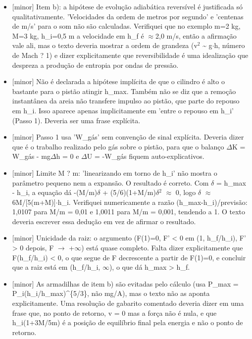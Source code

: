 \documentclass{article}%
\begin{document}
\begin{itemize}%
\item%
{[}minor{]} Item b): a hipótese de evolução adiabática reversível é justificada só qualitativamente. 'Velocidades da ordem de metros por segundo' e 'centenas de m/s' para o som não são calculadas. Verifiquei que no exemplo m=2 kg, M=3 kg, h\_i=0,5 m a velocidade em h\_f é $\approx$2,0 m/s, então a afirmação vale ali, mas o texto deveria mostrar a ordem de grandeza (v$^2$ \textasciitilde{} g$\cdot$h, número de Mach ? 1) e dizer explicitamente que reversibilidade é uma idealização que despreza a produção de entropia por ondas de pressão.%
\item%
{[}minor{]} Não é declarada a hipótese implícita de que o cilindro é alto o bastante para o pistão atingir h\_max. Também não se diz que a remoção instantânea da areia não transfere impulso ao pistão, que parte do repouso em h\_i. Isso aparece apenas implicitamente em 'entre o repouso em h\_i' (Passo 1). Deveria ser uma frase explícita.%
\item%
{[}minor{]} Passo 1 usa 'W\_gás' sem convenção de sinal explícita. Deveria dizer que é o trabalho realizado pelo gás sobre o pistão, para que o balanço $\Delta$K = W\_gás - mg$\Delta$h = 0 e $\Delta$U = -W\_gás fiquem auto{-}explicativos.%
\item%
{[}minor{]} Limite M ? m: 'linearizando em torno de h\_i' não mostra o parâmetro pequeno nem a expansão. O resultado é correto. Com $\delta$ = h\_max - h\_i, a equação dá -(M/m)$\delta$ + (5/6)(1+M/m)$\delta$$^2$ $\approx$ 0, logo $\delta$ $\approx$ 6M/{[}5(m+M){]}$\cdot$h\_i. Verifiquei numericamente a razão (h\_max-h\_i)/previsão: 1,0107 para M/m = 0,01 e 1,0011 para M/m = 0,001, tendendo a 1. O texto deveria escrever essa dedução em vez de afirmar o resultado.%
\item%
{[}minor{]} Unicidade da raiz: o argumento (F(1)=0, F' < 0 em (1, h\_f/h\_i), F' > 0 depois, F $\to$ +$\infty$) está quase completo. Falta dizer explicitamente que F(h\_f/h\_i) < 0, o que segue de F decrescente a partir de F(1)=0, e concluir que a raiz está em (h\_f/h\_i, $\infty$), o que dá h\_max > h\_f.%
\item%
{[}minor{]} As armadilhas de item b) são evitadas pelo cálculo (usa P\_max = P\_i(h\_i/h\_max)\^{}\{5/3\}, não mg/A), mas o texto não as aponta explicitamente. Uma resolução de gabarito comentado deveria dizer em uma frase que, no ponto de retorno, v = 0 mas a força não é nula, e que h\_i(1+3M/5m) é a posição de equilíbrio final pela energia e não o ponto de retorno.%
\end{itemize}%
\end{document}
